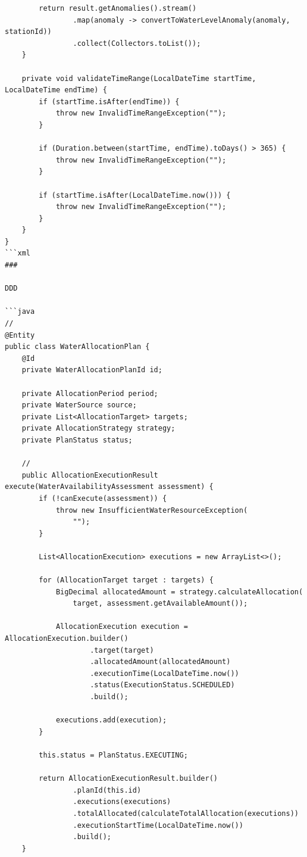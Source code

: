 \begin{verbatim}
        return result.getAnomalies().stream()
                .map(anomaly -> convertToWaterLevelAnomaly(anomaly, stationId))
                .collect(Collectors.toList());
    }
    
    private void validateTimeRange(LocalDateTime startTime, LocalDateTime endTime) {
        if (startTime.isAfter(endTime)) {
            throw new InvalidTimeRangeException("");
        }
        
        if (Duration.between(startTime, endTime).toDays() > 365) {
            throw new InvalidTimeRangeException("");
        }
        
        if (startTime.isAfter(LocalDateTime.now())) {
            throw new InvalidTimeRangeException("");
        }
    }
}
```xml
### 

DDD

```java
// 
@Entity
public class WaterAllocationPlan {
    @Id
    private WaterAllocationPlanId id;
    
    private AllocationPeriod period;
    private WaterSource source;
    private List<AllocationTarget> targets;
    private AllocationStrategy strategy;
    private PlanStatus status;
    
    // 
    public AllocationExecutionResult execute(WaterAvailabilityAssessment assessment) {
        if (!canExecute(assessment)) {
            throw new InsufficientWaterResourceException(
                "");
        }
        
        List<AllocationExecution> executions = new ArrayList<>();
        
        for (AllocationTarget target : targets) {
            BigDecimal allocatedAmount = strategy.calculateAllocation(
                target, assessment.getAvailableAmount());
                
            AllocationExecution execution = AllocationExecution.builder()
                    .target(target)
                    .allocatedAmount(allocatedAmount)
                    .executionTime(LocalDateTime.now())
                    .status(ExecutionStatus.SCHEDULED)
                    .build();
                    
            executions.add(execution);
        }
        
        this.status = PlanStatus.EXECUTING;
        
        return AllocationExecutionResult.builder()
                .planId(this.id)
                .executions(executions)
                .totalAllocated(calculateTotalAllocation(executions))
                .executionStartTime(LocalDateTime.now())
                .build();
    }
    

\end{verbatim}
